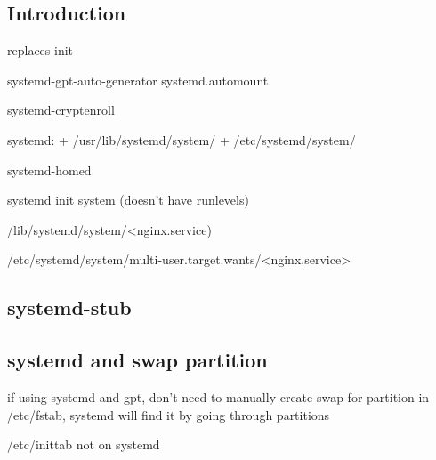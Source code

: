 
\subsection{Introduction}

replaces init


systemd-gpt-auto-generator
systemd.automount

systemd-cryptenroll



systemd:
+ /usr/lib/systemd/system/
+ /etc/systemd/system/


systemd-homed

systemd init system (doesn't have runlevels)

/lib/systemd/system/<nginx.service)

/etc/systemd/system/multi-user.target.wants/<nginx.service>


\subsection{systemd-stub}

\subsection{systemd and swap partition}
if using systemd and gpt, don't need to manually create swap for partition in /etc/fstab, systemd will find it by going through partitions

/etc/inittab not on systemd
